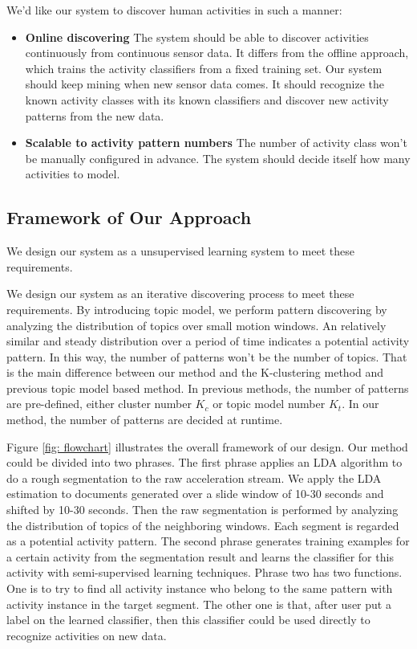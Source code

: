 \documentclass{sigchi}
\begin{document}
    We'd like our system to discover human activities in such a manner:
    \begin{itemize}
        \item \textbf{Online discovering}
        The system should be able to discover activities continuously from continuous sensor data.
        It differs from the offline approach, which trains the activity classifiers from a fixed training set.
        Our system should keep mining when new sensor data comes.
        It should recognize the known activity classes with its known classifiers and discover new activity patterns from the new data.

        \item \textbf{Scalable to activity pattern numbers}
        The number of activity class won't be manually configured in advance.
        The system should decide itself how many activities to model.

    \end{itemize}

\subsection{Framework of Our Approach}

    We design our system as a unsupervised learning system to meet these requirements.

    We design our system as an iterative discovering process to meet these requirements.
    By introducing topic model, we perform pattern discovering by analyzing the distribution of topics over small motion windows.
    An relatively similar and steady distribution over a period of time indicates a potential activity pattern.
    In this way, the number of patterns won't be the number of topics.
    That is the main difference between our method and the K-clustering method and previous topic model based method.
    In previous methods, the number of patterns are pre-defined, either cluster number $K_c$ or topic model number $K_t$.
    In our method, the number of patterns are decided at runtime.

    Figure \ref{fig: flowchart} illustrates the overall framework of our design.
    Our method could be divided into two phrases.
    The first phrase applies an LDA algorithm to do a rough segmentation to the raw acceleration stream.
    We apply the LDA estimation to documents generated over a slide window of 10-30 seconds and shifted by 10-30 seconds.
    Then the raw segmentation is performed by analyzing the distribution of topics of the neighboring windows.
    Each segment is regarded as a potential activity pattern.
    The second phrase generates training examples for a certain activity from the segmentation result and learns the classifier for this activity with semi-supervised learning techniques.
    Phrase two has two functions.
    One is to try to find all activity instance who belong to the same pattern with activity instance in the target segment.
    The other one is that, after user put a label on the learned classifier, then this classifier could be used directly to recognize activities on new data.
\end{document}
